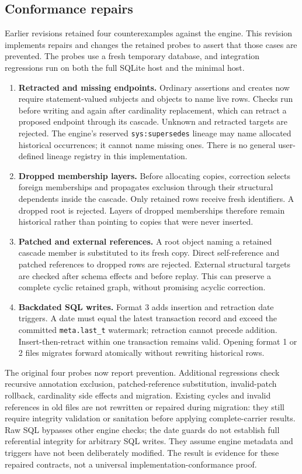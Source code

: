 \documentclass[11pt]{article}
\theoremstyle{plain}
\theoremstyle{definition}
\theoremstyle{remark}
\begin{document}
\subsection{Conformance repairs}

Earlier revisions retained four counterexamples against the engine. This
revision implements repairs and changes the retained probes to assert that
those cases are prevented. The probes use a fresh temporary database, and
integration regressions run on both the full SQLite host and the minimal host.

\begin{enumerate}
\item \textbf{Retracted and missing endpoints.} Ordinary assertions and creates
  now require statement-valued subjects and objects to name live rows. Checks
  run before writing and again after cardinality replacement, which can retract
  a proposed endpoint through its cascade. Unknown and retracted targets are
  rejected. The engine's reserved \texttt{sys:supersedes} lineage may name
  allocated historical occurrences; it cannot name missing ones. There is no
  general user-defined lineage registry in this implementation.
\item \textbf{Dropped membership layers.} Before allocating copies, correction
  selects foreign memberships and propagates exclusion through their structural
  dependents inside the cascade. Only retained rows receive fresh identifiers.
  A dropped root is rejected. Layers of dropped memberships therefore remain
  historical rather than pointing to copies that were never inserted.
\item \textbf{Patched and external references.} A root object naming a retained
  cascade member is substituted to its fresh copy. Direct self-reference and
  patched references to dropped rows are rejected. External structural targets
  are checked after schema effects and before replay. This can preserve a
  complete cyclic retained graph, without promising acyclic correction.
\item \textbf{Backdated SQL writes.} Format 3 adds insertion and retraction date
  triggers. A date must equal the latest transaction record and exceed the
  committed \texttt{meta.last\_t} watermark; retraction cannot precede addition.
  Insert-then-retract within one transaction remains valid. Opening format 1 or
  2 files migrates forward atomically without rewriting historical rows.
\end{enumerate}

The original four probes now report prevention. Additional regressions check
recursive annotation exclusion, patched-reference substitution, invalid-patch
rollback, cardinality side effects and migration. Existing cycles and invalid
references in old files are not rewritten or repaired during migration: they
still require integrity validation or sanitation before applying complete-carrier
results. Raw SQL bypasses other engine checks; the date guards do not establish
full referential integrity for arbitrary SQL writes. They assume engine metadata
and triggers have not been deliberately modified. The result is evidence for
these repaired contracts, not a universal implementation-conformance proof.
\end{document}
